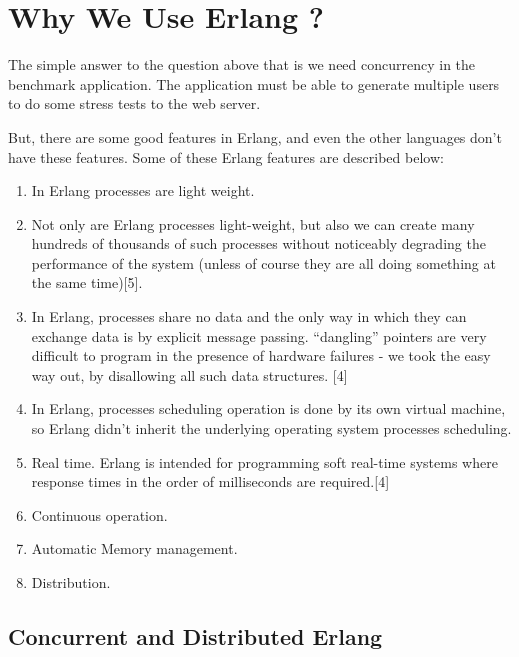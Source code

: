\documentclass[final,
notitlepage,
narroweqnarray,
    inline,
    twoside,
]{ieee}
\begin{document}
\section{Why We Use Erlang ?}

The simple answer to the question above that is we need
concurrency in the benchmark application. The application must be
able to generate multiple users to do some stress tests to the web
server.

But, there are some good features in Erlang, and even the other
languages don't have these features. Some of these Erlang features
are described below:

\begin{enumerate}
\item In Erlang processes are light weight.

\item Not only are Erlang processes light-weight, but also we can
create many hundreds of thousands of such processes without
noticeably degrading the performance of the system (unless of
course they are all doing something at the same time)[5].

\item In Erlang, processes share no data and the only way in which
they can exchange data is by explicit message passing.
``dangling'' pointers are very difficult to program in the
presence of hardware failures - we took the easy way out, by
disallowing all such data structures. [4]

\item In Erlang, processes scheduling operation is done by its own
virtual machine, so Erlang didn't inherit the underlying operating
system processes scheduling.

\item Real time. Erlang is intended for programming soft real-time
systems where response times in the order of milliseconds are
required.[4]

\item  Continuous operation.

\item  Automatic Memory management.

\item  Distribution.
\end{enumerate}



\subsection{Concurrent and Distributed Erlang}
\end{document}
